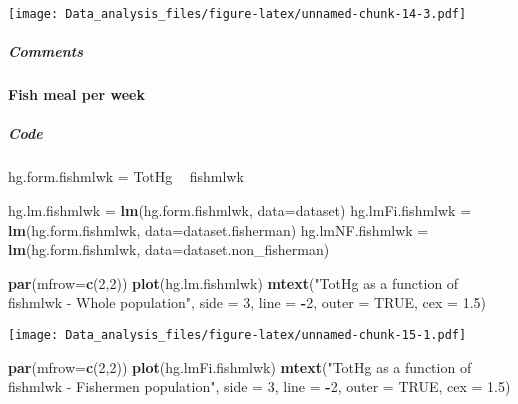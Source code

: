 \documentclass[12pt,]{article}
\newenvironment{Shaded}{\begin{snugshade}}{\end{snugshade}}
\newcommand{\KeywordTok}[1]{\textcolor[rgb]{0.13,0.29,0.53}{\textbf{#1}}}
\newcommand{\DataTypeTok}[1]{\textcolor[rgb]{0.13,0.29,0.53}{#1}}
\newcommand{\DecValTok}[1]{\textcolor[rgb]{0.00,0.00,0.81}{#1}}
\newcommand{\FloatTok}[1]{\textcolor[rgb]{0.00,0.00,0.81}{#1}}
\newcommand{\StringTok}[1]{\textcolor[rgb]{0.31,0.60,0.02}{#1}}
\newcommand{\OtherTok}[1]{\textcolor[rgb]{0.56,0.35,0.01}{#1}}
\newcommand{\OperatorTok}[1]{\textcolor[rgb]{0.81,0.36,0.00}{\textbf{#1}}}
\newcommand{\NormalTok}[1]{#1}
\let\oldparagraph\paragraph
\renewcommand{\paragraph}[1]{\oldparagraph{#1}\mbox{}}
\let\oldsubparagraph\subparagraph
\renewcommand{\subparagraph}[1]{\oldsubparagraph{#1}\mbox{}}
\begin{document}
\texttt{[image: Data\_analysis\_files/figure-latex/unnamed-chunk-14-3.pdf]}

\subparagraph{Comments}\label{comments-2}

\paragraph{Fish meal per week}\label{fish-meal-per-week}

\subparagraph{Code}\label{code-4}

\begin{Shaded}
\begin{Highlighting}[]
\NormalTok{hg.form.fishmlwk =}\StringTok{ }\NormalTok{TotHg }\OperatorTok{~}\StringTok{ }\NormalTok{fishmlwk}

\NormalTok{hg.lm.fishmlwk =}\StringTok{ }\KeywordTok{lm}\NormalTok{(hg.form.fishmlwk, }\DataTypeTok{data=}\NormalTok{dataset)}
\NormalTok{hg.lmFi.fishmlwk =}\StringTok{ }\KeywordTok{lm}\NormalTok{(hg.form.fishmlwk, }\DataTypeTok{data=}\NormalTok{dataset.fisherman)}
\NormalTok{hg.lmNF.fishmlwk =}\StringTok{ }\KeywordTok{lm}\NormalTok{(hg.form.fishmlwk, }\DataTypeTok{data=}\NormalTok{dataset.non_fisherman)}

\KeywordTok{par}\NormalTok{(}\DataTypeTok{mfrow=}\KeywordTok{c}\NormalTok{(}\DecValTok{2}\NormalTok{,}\DecValTok{2}\NormalTok{))}
\KeywordTok{plot}\NormalTok{(hg.lm.fishmlwk)}
\KeywordTok{mtext}\NormalTok{(}\StringTok{"TotHg as a function of fishmlwk - Whole population"}\NormalTok{, }\DataTypeTok{side =} \DecValTok{3}\NormalTok{, }\DataTypeTok{line =} \OperatorTok{-}\DecValTok{2}\NormalTok{, }\DataTypeTok{outer =} \OtherTok{TRUE}\NormalTok{, }\DataTypeTok{cex =} \FloatTok{1.5}\NormalTok{)}
\end{Highlighting}
\end{Shaded}

\texttt{[image: Data\_analysis\_files/figure-latex/unnamed-chunk-15-1.pdf]}

\begin{Shaded}
\begin{Highlighting}[]
\KeywordTok{par}\NormalTok{(}\DataTypeTok{mfrow=}\KeywordTok{c}\NormalTok{(}\DecValTok{2}\NormalTok{,}\DecValTok{2}\NormalTok{))}
\KeywordTok{plot}\NormalTok{(hg.lmFi.fishmlwk)}
\KeywordTok{mtext}\NormalTok{(}\StringTok{"TotHg as a function of fishmlwk - Fishermen population"}\NormalTok{, }\DataTypeTok{side =} \DecValTok{3}\NormalTok{, }\DataTypeTok{line =} \OperatorTok{-}\DecValTok{2}\NormalTok{, }\DataTypeTok{outer =} \OtherTok{TRUE}\NormalTok{, }\DataTypeTok{cex =} \FloatTok{1.5}\NormalTok{)}
\end{Highlighting}
\end{Shaded}
\end{document}
